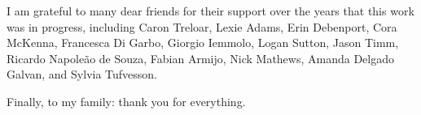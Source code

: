   I am grateful to many dear friends for their support over the years that this work was in progress, including Caron Treloar, Lexie Adams, Erin Debenport, Cora McKenna, Francesca Di Garbo, Giorgio Iemmolo, Logan Sutton, Jason Timm, Ricardo Napoleão de Souza, Fabian Armijo, Nick Mathews, Amanda Delgado Galvan, and Sylvia Tufvesson. 



  Finally, to my family: thank you for everything.



